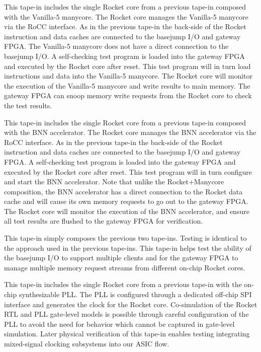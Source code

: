 \begin{cbxlist}{1.5em}{0em}{0.5em}
  \item {} This tape-in
     includes the single Rocket core from a previous tape-in composed
     with the Vanilla-5 manycore. The Rocket core manages the Vanilla-5
     manycore via the RoCC interface. As in the previous tape-in the
     back-side of the Rocket instruction and data caches are connected to
     the basejump I/O and gateway FPGA. The Vanilla-5 manycore does not
     have a direct connection to the basejump I/O. A self-checking test
     program is loaded into the gateway FPGA and executed by the Rocket
     core after reset. This test program will in turn load instructions
     and data into the Vanilla-5 manycore. The Rocket core will monitor
     the execution of the Vanilla-5 manycore and write results to main
     memory. The gateway FPGA can snoop memory write requests from the
     Rocket core to check the test results.

  \item {} This
     tape-in includes the single Rocket core from a previous tape-in
     composed with the BNN accelerator. The Rocket core manages the BNN
     accelerator via the RoCC interface. As in the previous tape-in the
     back-side of the Rocket instruction and data caches are connected to
     the basejump I/O and gateway FPGA. A self-checking test program is
     loaded into the gateway FPGA and executed by the Rocket core after
     reset. This test program will in turn configure and start the BNN
     accelerator. Note that unlike the Rocket+Manycore composition, the
     BNN accelerator has a direct connection to the Rocket data cache and
     will cause its own memory requests to go out to the gateway FPGA.
     The Rocket core will monitor the execution of the BNN accelerator,
     and ensure all test results are flushed to the gateway FPGA for
     verification.

  \item {} This tape-in simply composes the previous two tape-ins.
     Testing is identical to the approach used in the previous tape-ins.
     This tape-in helps test the ability of the basejump I/O to support
     multiple clients and for the gateway FPGA to manage multiple memory
     request streams from different on-chip Rocket cores.

  \item {} This
     tape-in includes the single Rocket core from a previous tape-in with
     the on-chip synthesizable PLL. The PLL is configured through a
     dedicated off-chip SPI interface and generates the clock for the
     Rocket core. Co-simulation of the Rocket RTL and PLL gate-level
     models is possible through careful configuration of the PLL to avoid
     the need for behavior which cannot be captured in gate-level
     simulation. Later physical verification of this tape-in enables
     testing integrating mixed-signal clocking subsystems into our ASIC
     flow.


\end{cbxlist}
